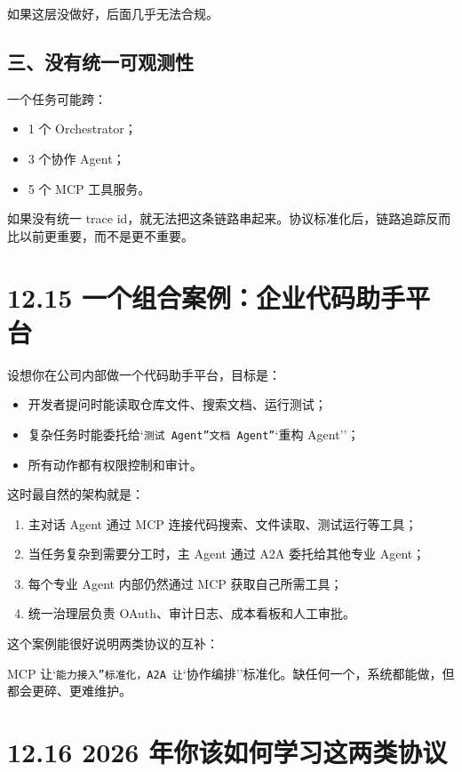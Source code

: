 如果这层没做好，后面几乎无法合规。


\subsection{三、没有统一可观测性}

一个任务可能跨：


\begin{itemize}[leftmargin=2em]
\item 1 个 Orchestrator；
\item 3 个协作 Agent；
\item 5 个 MCP 工具服务。
\end{itemize}

如果没有统一 trace id，就无法把这条链路串起来。协议标准化后，链路追踪反而比以前更重要，而不是更不重要。


\section{12.15 一个组合案例：企业代码助手平台}

设想你在公司内部做一个代码助手平台，目标是：


\begin{itemize}[leftmargin=2em]
\item 开发者提问时能读取仓库文件、搜索文档、运行测试；
\item 复杂任务时能委托给`\texttt{测试 Agent''}\texttt{文档 Agent''}`重构 Agent''；
\item 所有动作都有权限控制和审计。
\end{itemize}

这时最自然的架构就是：


\begin{enumerate}[leftmargin=2em]
\item 主对话 Agent 通过 MCP 连接代码搜索、文件读取、测试运行等工具；
\item 当任务复杂到需要分工时，主 Agent 通过 A2A 委托给其他专业 Agent；
\item 每个专业 Agent 内部仍然通过 MCP 获取自己所需工具；
\item 统一治理层负责 OAuth、审计日志、成本看板和人工审批。
\end{enumerate}

这个案例能很好说明两类协议的互补：

MCP 让`\texttt{能力接入''标准化，A2A 让}`协作编排''标准化。缺任何一个，系统都能做，但都会更碎、更难维护。


\section{12.16 2026 年你该如何学习这两类协议}

